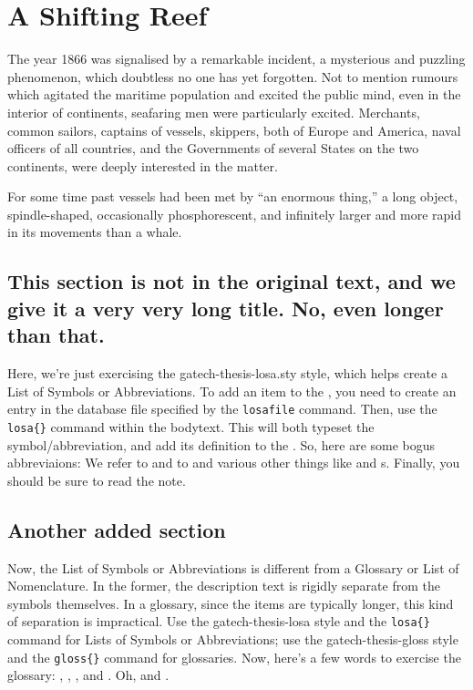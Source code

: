 \chapter{A Shifting Reef}

The year 1866 was signalised by a remarkable incident, a mysterious
and puzzling phenomenon, which doubtless no one has yet forgotten.
Not to mention rumours which agitated the maritime population
and excited the public mind, even in the interior of continents,
seafaring men were particularly excited.  Merchants, common sailors,
captains of vessels, skippers, both of Europe and America,
naval officers\cite{article-full} of all countries, and the 
Governments of several States
on the two continents, were deeply interested in the matter.

For some time past vessels had been met by ``an enormous thing,''
a long object, spindle-shaped, occasionally phosphorescent,
and infinitely larger and more rapid in its movements than a whale.

\section{This section is not in the original text, and we give it a very very long title. No, even longer than that.}

Here, we're just exercising the gatech-thesis-losa.sty style, which
helps create a List of Symbols or Abbreviations.  To add an item to 
the , you need to create an entry in the database file
specified by the \texttt{\bs{}losafile} command.  Then, use the 
\texttt{\bs{}losa\{\}} command within the bodytext.  This will both
typeset the symbol/abbreviation, and add its definition to the 
.  So, here are some bogus abbreviaions: We refer
to  and to  and various other things like
 and s.  Finally, you should be sure to read 
the  note.

\section{Another added section}

Now, the List of Symbols or Abbreviations is different from a Glossary
or List of Nomenclature.  In the former, the description text is rigidly
separate from the symbols themselves.  In a glossary, since the items 
are typically longer, this kind of separation is impractical.  Use the
gatech-thesis-losa style and the \texttt{\bs{}losa\{\}} command for 
Lists of Symbols or Abbreviations; use the gatech-thesis-gloss style 
and the \texttt{\bs{}gloss\{\}} command for glossaries.  Now, here's
a few words to exercise the glossary: ,
, , and .  Oh, and 
.

